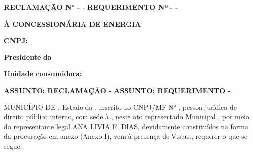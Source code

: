 \ifnum{}
\textbf{RECLAMAÇÃO N° \numReclamacao{} - \nomeMunicipioMaisculo{} - \siglaEstado{}}
\else
\textbf{REQUERIMENTO Nº \numReclamacao{} - \nomeMunicipioMaisculo{} - \siglaEstado{}}
\fi

\textbf{À CONCESSIONÁRIA DE ENERGIA \nomeConcessionaria{}}

\textbf{CNPJ: \cnpjConcessionaria{}}

\textbf{\presidenteConcessionaria{}}

\textbf{Presidente da \nomeConcessionaria{}}

\ifnum{}
\textbf{Unidade consumidora: \unidadeConsumidora{}}
\fi

\ifnum{}
\textbf{ASSUNTO: RECLAMAÇÃO - \tituloDocumento{}}
\else
\textbf{ASSUNTO: REQUERIMENTO - \tituloDocumento{}}
\fi

\vspace{0,25cm}

MUNICÍPIO DE \nomeMunicipioMaisculo{}, Estado da \nomeEstado{}, inscrito no CNPJ/MF N° \cnpjMunicipio{}, pessoa jurídica de direito público interno, com sede à \sedePrefeitura{}, neste ato representado \generoPrefeitura{} Municipal \nomePrefeito{}, por meio do representante legal ANA LIVIA F. DIAS, devidamente constituídos na forma da procuração em anexo (Anexo I), vem à presença de V.s.as., requerer o que se segue.